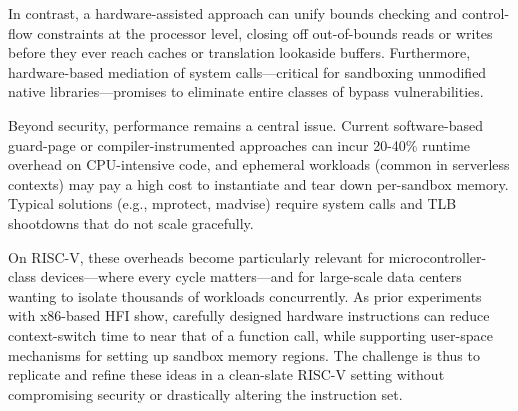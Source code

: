 \documentclass[conference,compsoc]{IEEEtran}
\begin{document}
In contrast, a hardware-assisted approach can unify bounds checking and control-flow constraints at the processor level, closing off out-of-bounds reads or writes before they ever reach caches or translation lookaside buffers. Furthermore, hardware-based mediation of system calls—critical for sandboxing unmodified native libraries—promises to eliminate entire classes of bypass vulnerabilities.

Beyond security, performance remains a central issue. Current software-based guard-page or compiler-instrumented approaches can incur 20-40\% runtime overhead on CPU-intensive code, and ephemeral workloads (common in serverless contexts) may pay a high cost to instantiate and tear down per-sandbox memory. Typical solutions (e.g., mprotect, madvise) require system calls and TLB shootdowns that do not scale gracefully.

On RISC-V, these overheads become particularly relevant for microcontroller-class devices—where every cycle matters—and for large-scale data centers wanting to isolate thousands of workloads concurrently. As prior experiments with x86-based HFI show, carefully designed hardware instructions can reduce context-switch time to near that of a function call, while supporting user-space mechanisms for setting up sandbox memory regions. The challenge is thus to replicate and refine these ideas in a clean-slate RISC-V setting without compromising security or drastically altering the instruction set.
\end{document}
